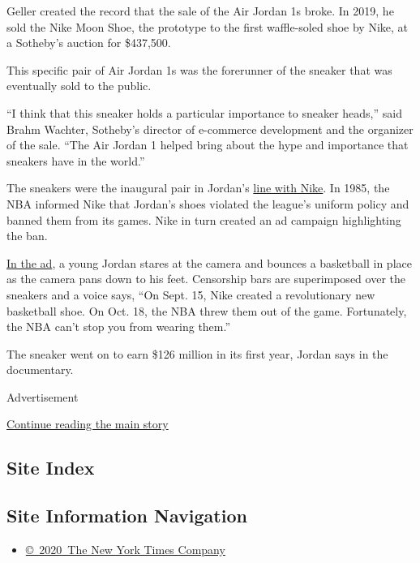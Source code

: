 Geller created the record that the sale of the Air Jordan 1s broke. In
2019, he sold the Nike Moon Shoe, the prototype to the first
waffle-soled shoe by Nike, at a Sotheby's auction for \$437,500.

This specific pair of Air Jordan 1s was the forerunner of the sneaker
that was eventually sold to the public.

``I think that this sneaker holds a particular importance to sneaker
heads,'' said Brahm Wachter, Sotheby's director of e-commerce
development and the organizer of the sale. ``The Air Jordan 1 helped
bring about the hype and importance that sneakers have in the world.''

The sneakers were the inaugural pair in Jordan's
\href{https://www.footlocker.com/history-of-air-jordan.html}{line with
Nike}. In 1985, the NBA informed Nike that Jordan's shoes violated the
league's uniform policy and banned them from its games. Nike in turn
created an ad campaign highlighting the ban.

\href{https://www.youtube.com/watch?v=eEmAgKYV1uo}{In the ad}, a young
Jordan stares at the camera and bounces a basketball in place as the
camera pans down to his feet. Censorship bars are superimposed over the
sneakers and a voice says, ``On Sept. 15, Nike created a revolutionary
new basketball shoe. On Oct. 18, the NBA threw them out of the game.
Fortunately, the NBA can't stop you from wearing them.''

The sneaker went on to earn \$126 million in its first year, Jordan says
in the documentary.

Advertisement

\protect\hyperlink{after-bottom}{Continue reading the main story}

\hypertarget{site-index}{%
\subsection{Site Index}\label{site-index}}

\hypertarget{site-information-navigation}{%
\subsection{Site Information
Navigation}\label{site-information-navigation}}

\begin{itemize}
\tightlist
\item
  \href{https://help.nytimes3xbfgragh.onion/hc/en-us/articles/115014792127-Copyright-notice}{©~2020~The
  New York Times Company}
\end{itemize}

